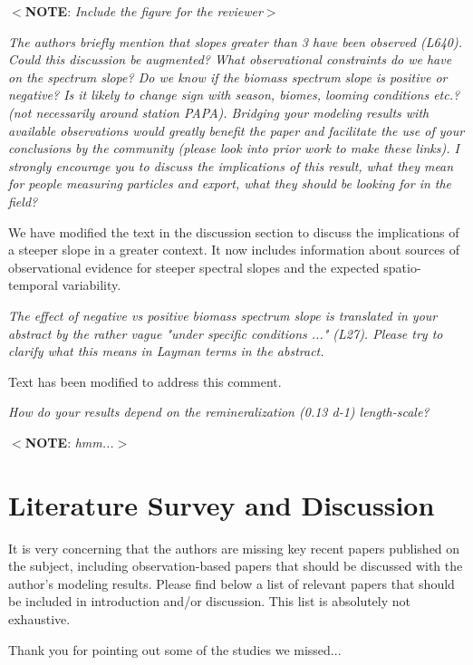 \documentclass[12pt,letter]{article}
\newcommand{\note}[1]{\color{red}$<$\textbf{NOTE}: \textit{#1}$>$\color{black}}
\begin{document}
\note{Include the figure for the reviewer}

\textit{The authors briefly mention that slopes greater than 3 have been observed (L640). Could this discussion be augmented? What observational constraints do we have on the spectrum slope? Do we know if the biomass spectrum slope is positive or negative? Is it likely to change sign with season, biomes, looming conditions etc.? (not necessarily around station PAPA). Bridging your modeling results with available observations would greatly benefit the paper and facilitate the use of your conclusions by the community (please look into prior work to make these links). I strongly encourage you to discuss the implications of this result, what they mean for people measuring particles and export, what they should be looking for in the field?}

{\color{blue}
	We have modified the text in the discussion section to discuss the implications of a steeper slope in a greater context. It now includes information about sources of observational evidence for steeper spectral slopes and the expected spatio-temporal variability.\\}
	
\textit{The effect of negative vs positive biomass spectrum slope is translated in your abstract by the rather vague "under specific conditions ..." (L27). Please try to clarify what this means in Layman terms in the abstract.}

{\color{blue}Text has been modified to address this comment.\\}	

\textit{How do your results depend on the remineralization (0.13 d-1) length-scale? \\}

\note{hmm...}

\section*{Literature Survey and Discussion}
It is very concerning that the authors are missing key recent papers published on the subject, including observation-based papers that should be discussed with the author's modeling results. Please find below a list of relevant papers that should be included in introduction and/or discussion. This list is absolutely not exhaustive. 

{\color{red} Thank you for pointing out some of the studies we missed... }
\end{document}
